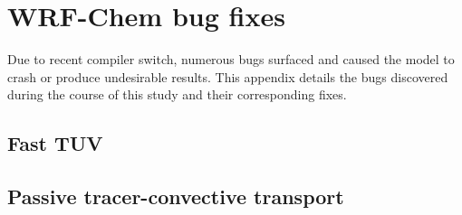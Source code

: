 \chapter{WRF-Chem bug fixes} \label{apdx:bug}

\ifpdf
    \graphicspath{{Appendix/figures/PNG/}{Appendix/figures/PDF/}{Appendix/figures/}}
\else
    \graphicspath{{Appendix/figures/EPS/}{Appendix/figures/}}
\fi

Due to recent compiler switch, numerous bugs surfaced and caused the model to crash or produce undesirable results. This appendix details the bugs discovered during the course of this study and their corresponding fixes.

\section{Fast TUV}\label{a-sec:bug/ftuv}



\section{Passive tracer-convective transport}\label{a-sec:bug/tracer}